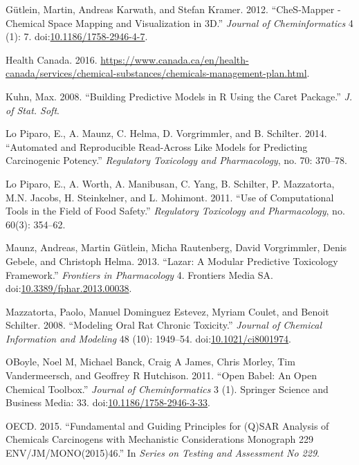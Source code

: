 \documentclass[]{achemso}
\begin{document}
\hypertarget{ref-Guetlein2012}{}
Gütlein, Martin, Andreas Karwath, and Stefan Kramer. 2012. ``CheS-Mapper
- Chemical Space Mapping and Visualization in 3D.'' \emph{Journal of
Cheminformatics} 4 (1): 7.
doi:\href{https://doi.org/10.1186/1758-2946-4-7}{10.1186/1758-2946-4-7}.

\hypertarget{ref-HealthCanada2016}{}
Health Canada. 2016.
\url{https://www.canada.ca/en/health-canada/services/chemical-substances/chemicals-management-plan.html}.

\hypertarget{ref-Kuhn08}{}
Kuhn, Max. 2008. ``Building Predictive Models in R Using the Caret
Package.'' \emph{J. of Stat. Soft}.

\hypertarget{ref-LoPiparo2014}{}
Lo Piparo, E., A. Maunz, C. Helma, D. Vorgrimmler, and B. Schilter.
2014. ``Automated and Reproducible Read-Across Like Models for
Predicting Carcinogenic Potency.'' \emph{Regulatory Toxicology and
Pharmacology}, no. 70: 370--78.

\hypertarget{ref-LoPiparo2011}{}
Lo Piparo, E., A. Worth, A. Manibusan, C. Yang, B. Schilter, P.
Mazzatorta, M.N. Jacobs, H. Steinkelner, and L. Mohimont. 2011. ``Use of
Computational Tools in the Field of Food Safety.'' \emph{Regulatory
Toxicology and Pharmacology}, no. 60(3): 354--62.

\hypertarget{ref-Maunz2013}{}
Maunz, Andreas, Martin Gütlein, Micha Rautenberg, David Vorgrimmler,
Denis Gebele, and Christoph Helma. 2013. ``Lazar: A Modular Predictive
Toxicology Framework.'' \emph{Frontiers in Pharmacology} 4. Frontiers
Media SA.
doi:\href{https://doi.org/10.3389/fphar.2013.00038}{10.3389/fphar.2013.00038}.

\hypertarget{ref-mazzatorta08}{}
Mazzatorta, Paolo, Manuel Dominguez Estevez, Myriam Coulet, and Benoit
Schilter. 2008. ``Modeling Oral Rat Chronic Toxicity.'' \emph{Journal of
Chemical Information and Modeling} 48 (10): 1949--54.
doi:\href{https://doi.org/10.1021/ci8001974}{10.1021/ci8001974}.

\hypertarget{ref-OBoyle2011}{}
OBoyle, Noel M, Michael Banck, Craig A James, Chris Morley, Tim
Vandermeersch, and Geoffrey R Hutchison. 2011. ``Open Babel: An Open
Chemical Toolbox.'' \emph{Journal of Cheminformatics} 3 (1). Springer
Science and Business Media: 33.
doi:\href{https://doi.org/10.1186/1758-2946-3-33}{10.1186/1758-2946-3-33}.

\hypertarget{ref-OECD2015}{}
OECD. 2015. ``Fundamental and Guiding Principles for (Q)SAR Analysis of
Chemicals Carcinogens with Mechanistic Considerations Monograph 229
ENV/JM/MONO(2015)46.'' In \emph{Series on Testing and Assessment No
229}.
\end{document}
